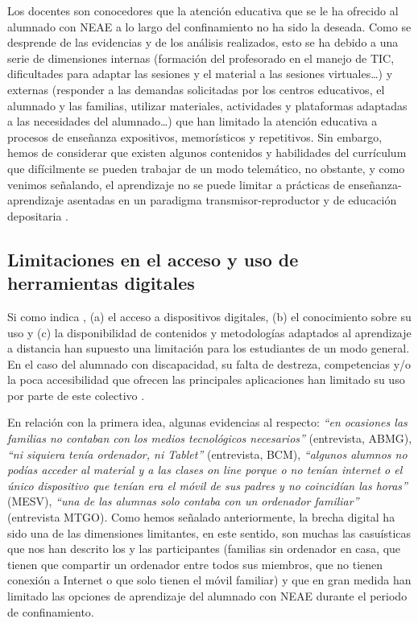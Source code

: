 \documentclass{textolivre}
\begin{document}
Los docentes son conocedores que la atención educativa que se le ha ofrecido al alumnado con NEAE a lo largo del confinamiento no ha sido la deseada. Como se desprende de las evidencias y de los análisis realizados, esto se ha debido a una serie de dimensiones internas (formación del profesorado en el manejo de TIC, dificultades para adaptar las sesiones y el material a las sesiones virtuales…) y externas (responder a las demandas solicitadas por los centros educativos, el alumnado y las familias, utilizar materiales, actividades y plataformas adaptadas a las necesidades del alumnado…) que han limitado la atención educativa a procesos de enseñanza expositivos, memorísticos y repetitivos. Sin embargo, hemos de considerar que existen algunos contenidos y habilidades del currículum que difícilmente se pueden trabajar de un modo telemático, no obstante, y como venimos señalando, el aprendizaje no se puede limitar a prácticas de enseñanza-aprendizaje asentadas en un paradigma transmisor-reproductor y de educación depositaria \cite{freire1970}. %

\subsection{Limitaciones en el acceso y uso de herramientas digitales}
Si como indica \textcite[p. 176]{rogero2020}, %
(a) el acceso a dispositivos digitales, (b) el conocimiento sobre su uso y (c) la disponibilidad de contenidos y metodologías adaptados al aprendizaje a distancia han supuesto una limitación para los estudiantes de un modo general. En el caso del alumnado con discapacidad, su falta de destreza, competencias y/o la poca accesibilidad que ofrecen las principales aplicaciones han limitado su uso por parte de este colectivo \cite{murillo2020}. %

En relación con la primera idea, algunas evidencias al respecto: \emph{“en ocasiones las familias no contaban con los medios tecnológicos necesarios”} (entrevista, ABMG), \emph{“ni siquiera tenía ordenador, ni Tablet”} (entrevista, BCM), \emph{“algunos alumnos no podías acceder al material y a las clases on line porque o no tenían internet o el único dispositivo que tenían era el móvil de sus padres y no coincidían las horas”} (MESV), \emph{“una de las alumnas solo contaba con un ordenador familiar”} (entrevista MTGO). Como hemos señalado anteriormente, la brecha digital ha sido una de las dimensiones limitantes, en este sentido, son muchas las casuísticas que nos han descrito los y las participantes (familias sin ordenador en casa, que tienen que compartir un ordenador entre todos sus miembros, que no tienen conexión a Internet o que solo tienen el móvil familiar) y que en gran medida han limitado las opciones de aprendizaje del alumnado con NEAE durante el periodo de confinamiento.  
\end{document}
